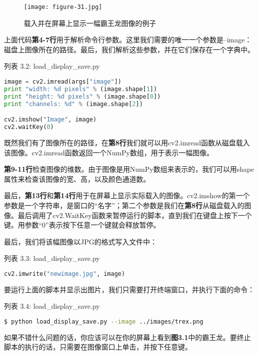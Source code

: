 \documentclass[color=green,mathpazo,titlestyle=hang]{elegantbook}
\begin{document}
\begin{figure}[!hbtp]
\centering  %
\texttt{[image: figure-31.jpg]}
\caption{载入并在屏幕上显示一幅霸王龙图像的例子\label{figur:Tyrannosaurus-Rex}}
\end{figure}

上面代码\textbf{第4-7行}用于解析命令行参数。这里我们需要的唯一一个参数是--image：磁盘上图像所在的路径。最后，我们解析这些参数，并在它们保存在一个字典中。

列表 3.2: load\_display\_save.py

\begin{lstlisting}[language=python]
image = cv2.imread(args["image"])
print "width: %d pixels" % (image.shape[1])
print "height: %d pixels" % (image.shape[0])
print "channels: %d" % (image.shape[2])

cv2.imshow("Image", image)
cv2.waitKey(0)
\end{lstlisting}

既然我们有了图像所在的路径，在\textbf{第8行}我们就可以用cv2.imread函数从磁盘载入该图像。cv2.imread函数返回一个NumPy数组，用于表示一幅图像。

\textbf{第9-11行}检查图像的维数。由于图像是用NumPy数组来表示的，我们可以用shape属性来检查该图像的宽、高，以及颜色通道数。

最后，\textbf{第13行}和\textbf{第14行}用于在屏幕上显示实际载入的图像。cv2.imshow的第一个参数是一个字符串，是窗口的“名字”；第二个参数是我们在\textbf{第8行}从磁盘载入的图像。最后调用了cv2.WaitKey函数来暂停运行的脚本，直到我们在键盘上按下一个键。用参数“0”表示按下任意一个键就会释放暂停。

最后，我们将该幅图像以JPG的格式写入文件中：

列表 3.3: load\_display\_save.py

\begin{lstlisting}[language=python]
cv2.imwrite("newimage.jpg", image)
\end{lstlisting}

要运行上面的脚本并显示出图片，我们只需要打开终端窗口，并执行下面的命令：

列表 3.4: load\_display\_save.py

\begin{lstlisting}[language=bash]
$ python load_display_save.py --image ../images/trex.png
\end{lstlisting}

如果不错什么问题的话，你应该可以在你的屏幕上看到\textbf{图3.1}中的霸王龙。要终止脚本的执行的话，只需要在图像窗口上单击，并按下任意键。
\end{document}
